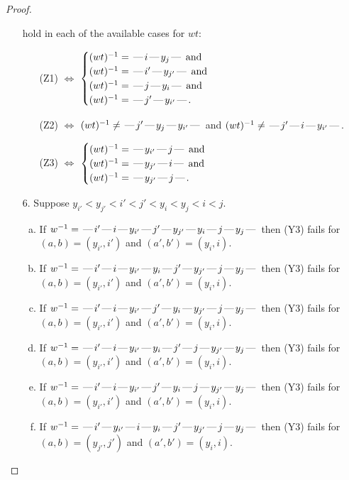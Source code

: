\documentclass[10pt]{article}
\theoremstyle{definition}
\theoremstyle{definition}
\def\dash{\text{\hspace{0.5mm}---\hspace{0.5mm}}}
\begin{document}
\begin{proof}
\begin{enumerate}
hold in each of the available cases for $wt$:
\begin{enumerate}
\item[](Z1) $\Leftrightarrow$ $\begin{cases}\text{$(wt)^{-1} = \dash i \dash y_j \dash$}\text{ and }\\
\text{$(wt)^{-1} = \dash i' \dash y_{j'} \dash$}\text{ and }\\
\text{$(wt)^{-1} = \dash j \dash y_i \dash$}\text{ and }\\
\text{$(wt)^{-1} = \dash j' \dash y_{i'} \dash$}.\end{cases}$
\item[](Z2) $\Leftrightarrow$ $(wt)^{-1} \neq \dash j' \dash y_j \dash y_{i'} \dash$ and $(wt)^{-1}\neq \dash j' \dash i \dash y_{i'} \dash$.
\item[](Z3) $\Leftrightarrow$ $\begin{cases}\text{$(wt)^{-1} = \dash y_{i'} \dash j \dash$}\text{ and }\\
\text{$(wt)^{-1} = \dash y_{j'} \dash i \dash$}\text{ and }\\
\text{$(wt)^{-1} = \dash y_{j'} \dash j \dash$}.\end{cases}$
\end{enumerate}
\item[$6$.] Suppose $y_{i'} < y_{j'} < i' < j' < y_i < y_j < i < j$.
\begin{enumerate}[(a)]
\item If $w^{-1} = \dash i'\dash i\dash y_{i'}\dash j'\dash y_{j'}\dash y_i\dash j\dash y_j\dash $ then (Y3) fails for $(a,b)=(y_{i'},i')$ and $(a',b')=(y_i,i)$.
\item If $w^{-1} = \dash i'\dash i\dash y_{i'}\dash y_i\dash j'\dash y_{j'}\dash j\dash y_j\dash $ then (Y3) fails for $(a,b)=(y_{i'},i')$ and $(a',b')=(y_i,i)$.
\item If $w^{-1} = \dash i'\dash i\dash y_{i'}\dash j'\dash y_i\dash y_{j'}\dash j\dash y_j\dash $ then (Y3) fails for $(a,b)=(y_{i'},i')$ and $(a',b')=(y_i,i)$.
\item If $w^{-1} = \dash i'\dash i\dash y_{i'}\dash y_i\dash j'\dash j\dash y_{j'}\dash y_j\dash $ then (Y3) fails for $(a,b)=(y_{i'},i')$ and $(a',b')=(y_i,i)$.
\item If $w^{-1} = \dash i'\dash i\dash y_{i'}\dash j'\dash y_i\dash j\dash y_{j'}\dash y_j\dash $ then (Y3) fails for $(a,b)=(y_{i'},i')$ and $(a',b')=(y_i,i)$.
\item If $w^{-1} = \dash i'\dash y_{i'}\dash i\dash y_i\dash j'\dash y_{j'}\dash j\dash y_j\dash $ then (Y3) fails for $(a,b)=(y_{j'},j')$ and $(a',b')=(y_i,i)$.

\end{enumerate}
\end{enumerate}
\end{proof}
\end{document}
